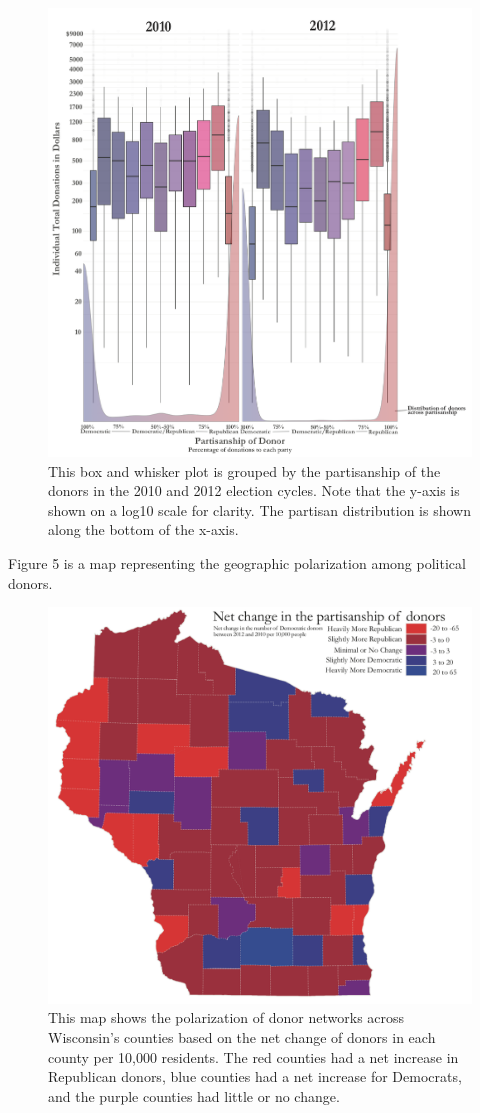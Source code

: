 \documentclass[12pt,]{article}
\begin{document}
\begin{figure}
\includegraphics[width=0.9\linewidth]{../figures/fig4} \caption{This box and whisker plot is grouped by the partisanship of the donors in the 2010 and 2012 election cycles. Note that the y-axis is shown on a log10 scale for clarity. The partisan distribution is shown along the bottom of the x-axis.}\label{fig:unnamed-chunk-15}
\end{figure}

Figure 5 is a map representing the geographic polarization among
political donors.

\begin{figure}
\includegraphics[width=0.9\linewidth]{../figures/fig5} \caption{This map shows the polarization of donor networks across Wisconsin's counties based on the net change of donors in each county per 10,000 residents. The red counties had a net increase in Republican donors, blue counties had a net increase for Democrats, and the purple counties had little or no change.}\label{fig:unnamed-chunk-16}
\end{figure}
\end{document}
